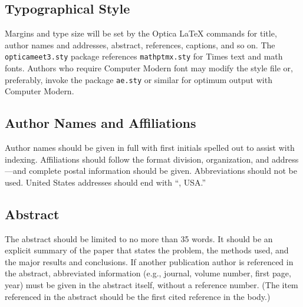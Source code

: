 \documentclass[letterpaper,10pt]{article}
\begin{document}

\subsection{Typographical Style}
Margins and type size will be set by the Optica \LaTeX{}
commands for title, author names and addresses, abstract,
references, captions, and so on. The \texttt{opticameet3.sty} package
references \texttt{mathptmx.sty} for Times text and math fonts.
Authors who require Computer Modern font may modify the style file
or, preferably, invoke the package \texttt{ae.sty} or similar for
optimum output with Computer Modern.

\subsection{Author Names and Affiliations}
Author names should be given in full with first initials spelled out to assist with indexing.
Affiliations should follow the format division, organization, and address---and complete postal information should be given.
Abbreviations should not be used. United States addresses should end
with ``, USA.''

\subsection{Abstract} The abstract
should be limited to no more than 35 words. It should be an
explicit summary of the paper that states the problem, the methods
used, and the major results and conclusions. If another publication author is referenced in the abstract, abbreviated information
(e.g., journal, volume number, first page, year) must be
given in the abstract itself, without a reference number. (The item referenced in the abstract should be the first
cited reference  in the body.)
\end{document}
